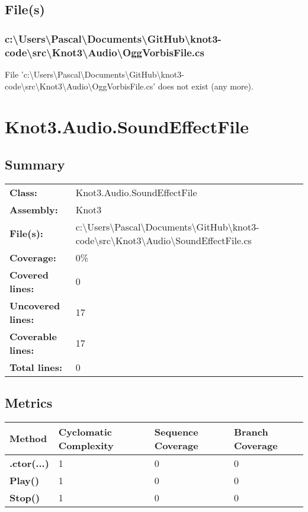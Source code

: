 \documentclass[a4paper,10pt]{article}
\begin{document}
\subsection{File(s)}
\subsubsection{c:\textbackslash Users\textbackslash Pascal\textbackslash Documents\textbackslash GitHub\textbackslash knot3-code\textbackslash src\textbackslash Knot3\textbackslash Audio\textbackslash OggVorbisFile.cs}
 File 'c:\textbackslash Users\textbackslash Pascal\textbackslash Documents\textbackslash GitHub\textbackslash knot3-code\textbackslash src\textbackslash Knot3\textbackslash Audio\textbackslash OggVorbisFile.cs' does not exist (any more).
\newpage
\section{Knot3.Audio.SoundEffectFile}
\subsection{Summary}
\begin{longtable}[l]{ll}
\textbf{Class:} & Knot3.Audio.SoundEffectFile\\
\textbf{Assembly:} & Knot3\\
\textbf{File(s):} & \begin{minipage}[t]{12cm}{c:\textbackslash Users\textbackslash Pascal\textbackslash Documents\textbackslash GitHub\textbackslash knot3-code\textbackslash src\textbackslash Knot3\textbackslash Audio\textbackslash SoundEffectFile.cs}\end{minipage} \\
\textbf{Coverage:} & 0\%\\
\textbf{Covered lines:} & 0\\
\textbf{Uncovered lines:} & 17\\
\textbf{Coverable lines:} & 17\\
\textbf{Total lines:} & 0\\
\end{longtable}
\subsection{Metrics}
\begin{longtable}[l]{|l|l|l|l|}
\hline
\textbf{Method} & \textbf{Cyclomatic Complexity} & \textbf{Sequence Coverage} & \textbf{Branch Coverage}\\
\hline
\textbf{.ctor(...)} & 1 & 0 & 0\\
\hline
\textbf{Play()} & 1 & 0 & 0\\
\hline
\textbf{Stop()} & 1 & 0 & 0\\
\hline
\end{longtable}
\end{document}
